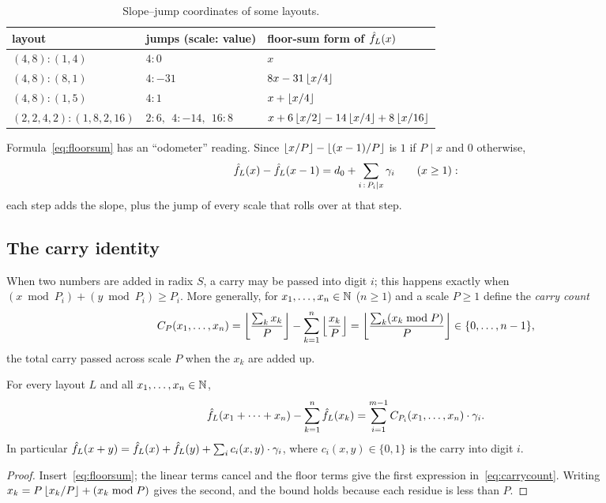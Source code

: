 \begin{table}[t]\centering
\begin{tabular}{@{}lll@{}}
\toprule
layout & jumps (scale: value) & floor-sum form of $\hat{f}_{L}(x)$\\
\midrule
$(4,8):(1,4)$ & $4\colon 0$ & $x$\\
$(4,8):(8,1)$ & $4\colon -31$ & $8x-31\left\lfloor x/4 \right\rfloor$\\
$(4,8):(1,5)$ & $4\colon 1$ & $x+\left\lfloor x/4 \right\rfloor$\\
$(2,2,4,2):(1,8,2,16)$ & $2\colon 6,\ \ 4\colon -14,\ \ 16\colon 8$ & $x+6\left\lfloor x/2 \right\rfloor-14\left\lfloor x/4 \right\rfloor+8\left\lfloor x/16 \right\rfloor$\\
\bottomrule
\end{tabular}
\caption{Slope--jump coordinates of some layouts.}\label{tab:jumps}
\end{table}

Formula~\eqref{eq:floorsum} has an ``odometer'' reading. Since
$\left\lfloor x/P \right\rfloor-\left\lfloor (x-1)/P \right\rfloor$ is $1$ if $P\mid x$ and $0$ otherwise,
\begin{equation}\label{eq:odometer}
 \hat{f}_{L}(x)-\hat{f}_{L}(x-1)=d_0+\sum_{i\,:\,P_i\mid x}\gamma_i\qquad(x\ge1):
\end{equation}
each step adds the slope, plus the jump of every scale that rolls over at that step.

\subsection{The carry identity}

When two numbers are added in radix $S$, a carry may be passed into digit $i$; this happens
exactly when $(x\bmod P_i)+(y\bmod P_i)\ge P_i$. More generally, for $x_1,\dots,x_n\in\mathbb{N}$
($n\ge1$) and a scale $P\ge1$ define the \emph{carry count}
\begin{equation}\label{eq:carrycount}
 C_P(x_1,\dots,x_n)=\left\lfloor \frac{\sum_kx_k}{P} \right\rfloor-\sum_{k=1}^n\left\lfloor \frac{x_k}{P} \right\rfloor
 =\left\lfloor \frac{\sum_k(x_k\bmod P)}{P} \right\rfloor\in\{0,\dots,n-1\},
\end{equation}
the total carry passed across scale $P$ when the $x_k$ are added up.

\begin{theorem}\label{thm:carry}
For every layout $L$ and all $x_1,\dots,x_n\in\mathbb{N}$,
\begin{equation}\label{eq:carry}
 \hat{f}_{L}(x_1+\dots+x_n)-\sum_{k=1}^n\hat{f}_{L}(x_k)=\sum_{i=1}^{m-1}C_{P_i}(x_1,\dots,x_n)\cdot\gamma_i .
\end{equation}
In particular $\hat{f}_{L}(x+y)=\hat{f}_{L}(x)+\hat{f}_{L}(y)+\sum_i c_i(x,y)\cdot\gamma_i$, where
$c_i(x,y)\in\{0,1\}$ is the carry into digit $i$.
\end{theorem}
\begin{proof}
Insert~\eqref{eq:floorsum}; the linear terms cancel and the floor terms give the first expression
in~\eqref{eq:carrycount}. Writing $x_k=P\left\lfloor x_k/P \right\rfloor+(x_k\bmod P)$ gives the second, and the bound
holds because each residue is less than $P$.
\end{proof}

